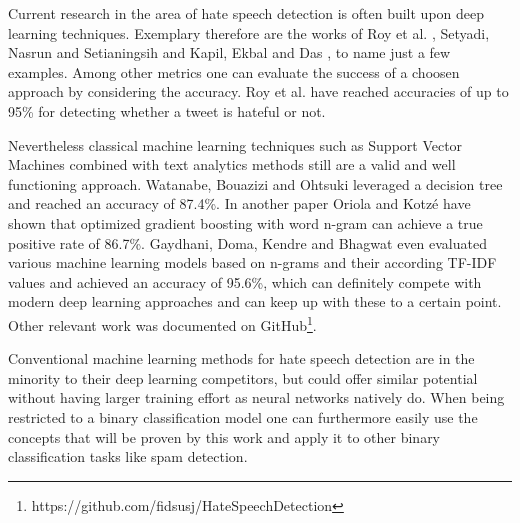 Current research in the area of hate speech detection is often built upon deep learning techniques. Exemplary therefore are the works of Roy et al. \cite{Roy.2020}, Setyadi, Nasrun and Setianingsih \cite{NabiilaAdaniSetyadi.2018} and Kapil, Ekbal and Das \cite{Kapil.2020}, to name just a few examples. Among other metrics one can evaluate the success of a choosen approach by considering the accuracy. Roy et al. \cite{Roy.2020} have reached accuracies of up to 95\% for detecting whether a tweet is hateful or not.

Nevertheless classical machine learning techniques such as Support Vector Machines combined with text analytics methods still are a valid and well functioning approach.
Watanabe, Bouazizi and Ohtsuki \cite{Watanabe.2018} leveraged a de\-ci\-sion tree and reached an accuracy of 87.4\%. In another paper Oriola and Kotz{\'e} \cite{Oriola.2020} have shown that optimized gradient boosting with word n-gram can achieve a true positive rate of 86.7\%. Gaydhani, Doma, Kendre and Bhagwat \cite{AdityaGaydhani.2018} even evaluated various machine learning models based on n-grams and their according TF-IDF values and achieved an accuracy of 95.6\%, which can definitely compete with modern deep learning approaches and can keep up with these to a certain point. Other relevant work was documented on GitHub\footnote{https://github.com/fidsusj/HateSpeechDetection}. 

Conventional machine learning methods for hate speech detection are in the minority to their deep learning competitors, but could offer similar potential without having larger training effort as neural networks natively do. When being restricted to a binary classification model one can furthermore easily use the concepts that will be proven by this work and apply it to other binary classification tasks like spam detection.

\newpage
